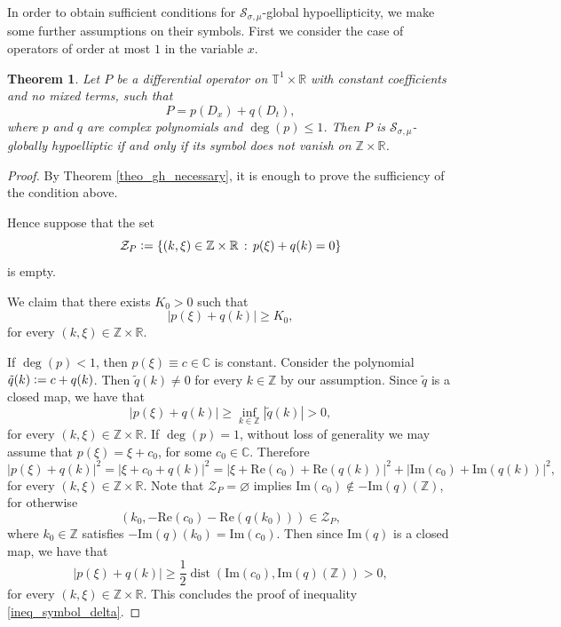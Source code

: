 \documentclass[11pt,reqno]{amsart}
\newtheorem{theorem}{Theorem}[section]
\numberwithin{equation}{section}
\theoremstyle{definition}
\theoremstyle{definition}
\newcommand{\T}{\mathbb{T}}
\newcommand{\R}{\mathbb{R}}
\newcommand{\Z}{\mathbb{Z}}
\newcommand{\Real}{\mathrm{Re}}
\newcommand{\Imag}{\mathrm{Im}}
\newcommand{\defeq}{\vcentcolon=}
\begin{document}
In order to obtain sufficient conditions for $\mathcal{S}_{\sigma,\mu}$-global hypoellipticity, we make some further assumptions on their symbols. First we consider the case of operators of order at most $1$ in the variable $x$.

\begin{theorem}\label{theo_gh_cte_Nleq1}
    Let $P$ be a differential operator on $\T^1\times\R$ with constant coefficients and no mixed terms, such that  $$P=p\left(D_x\right)+q\left(D_t\right),$$
   where $p$ and $q$ are complex polynomials and $\deg(p)\leq 1$. Then $P$ is $\mathcal{S}_{\sigma,\mu}$-globally hypoelliptic if and only if its symbol does not vanish on $\Z\times \R$.
\end{theorem}
\begin{proof}
     By Theorem \ref{theo_gh_necessary}, it is enough to prove the sufficiency of the condition above.
 
  Hence suppose that the set 
   \[\mathcal{Z}_P\defeq\{(k,\xi)\in\Z\times\R\,:\,p(\xi)+q(k)=0\}\]
   is empty.

    We claim that there exists $K_0> 0$ such that
    \begin{equation}\label{ineq_symbol_delta}
        |p(\xi)+q(k)|\geq K_0,
    \end{equation}
    for every $(k,\xi)\in\Z\times \R$.
    
    If $\deg(p)<1$, then $p(\xi)\equiv c\in\mathbb{C}$ is constant.  Consider the polynomial $\tilde q(k)\defeq c+q(k)$.
    Then  $\tilde q(k)\neq 0$ for every $k\in\Z$ by our assumption. Since $\tilde q$ is a closed map, we have that
    \begin{equation*}
        |p(\xi)+q(k)|\geq \inf_{k\in\Z}|\tilde q(k)|>0,
    \end{equation*}
    for every $(k,\xi)\in\Z\times \R$. If $\deg(p)=1$, without loss of generality we may assume that $p(\xi)=\xi+c_0$, for some $c_0\in\mathbb{C}$. Therefore
    \begin{equation*}
        |p(\xi)+q(k)|^2=|\xi+c_0+q(k)|^2= |\xi +\Real(c_0)+\Real(q(k))|^2+|\Imag(c_0)+\Imag(q(k))|^2,
    \end{equation*}
    for every $(k,\xi)\in\Z\times \R$. Note that $\mathcal{Z}_P=\varnothing$ implies $\Imag(c_0)\not\in -\Imag(q)(\Z)$, for otherwise 
    \begin{equation*}
        (k_0,-\Real(c_0)-\Real(q(k_0)))\in \mathcal{Z}_P,
    \end{equation*}
    where $k_0\in\Z$ satisfies $-\Imag(q)(k_0)=\Imag(c_0)$. Then since $\Imag(q)$ is a closed map, we have that 
\begin{equation*}
    |p(\xi)+q(k)|\geq \frac{1}{2}\operatorname{dist}(\Imag(c_0),\Imag(q)(\Z))>0,
\end{equation*}
for every $(k,\xi)\in\Z\times \R$. This concludes the proof of inequality \eqref{ineq_symbol_delta}.


\end{proof}
\end{document}
